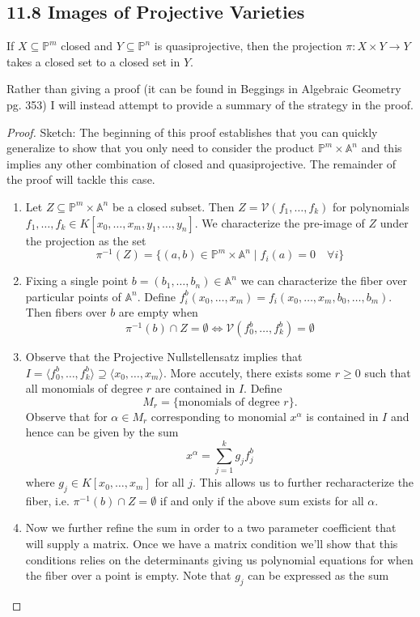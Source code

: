\documentclass[40pt]{article}
\newcommand{\Proj}{\mathbb{P}}
\newcommand{\A}{\mathbb{A}}
\newcommand{\V}{\mathcal{V}}
\newcommand{\la}{\langle}
\newcommand{\ra}{\rangle}
\theoremstyle{remark}
\begin{document}
			\subsection{11.8 Images of Projective Varieties}
			\begin{prop}
				If $X \subseteq \Proj^m$ closed and $Y \subseteq \Proj^n$ is quasiprojective, then the projection $\pi : X \times Y \to Y$ takes a closed set to a closed set in $Y$. 
			\end{prop}
			Rather than giving a proof (it can be found in Beggings in Algebraic Geometry pg. 353) I will instead attempt to provide a summary of the strategy in the proof. 
			\begin{proof}
				Sketch: The beginning of this proof establishes that you can quickly generalize to show that you only need to consider the product $\Proj^m \times \A^n$ and this implies any other combination of closed and quasiprojective. The remainder of the proof will tackle this case. 
				\begin{enumerate}
					\item[1)] Let $Z \subseteq \Proj^m \times \A^n$ be a closed subset. Then $Z =\V(f_1,\dots,f_k)$ for polynomials $f_1,\dots,f_k \in K[x_0,\dots,x_m,y_1,\dots,y_n]$. We characterize the pre-image of $Z$ under the projection as the set
					\[
					\pi^{-1}(Z) = \{(a,b) \in \Proj^m \times \A^n \; | \; f_i(a) = 0 \quad \forall i\}
					\]
					\item[2)] Fixing a single point $b = (b_1,\dots,b_n) \in \A^n$ we can characterize the fiber over particular points of $\A^n$. Define $f_i^b(x_0,\dots,x_m) = f_i(x_0,\dots,x_m,b_0,\dots,b_m)$. Then fibers over $b$ are empty when
					\[
					\pi^{-1}(b) \cap Z = \emptyset \iff \V(f_0^b,\dots,f_k^b) = \emptyset
					\]
					\item[3)] Observe that the Projective Nullstellensatz implies that $I = \la f_0^b ,\dots,f_k^b \ra  \supseteq \la x_0,\dots,x_m\ra$. More accutely, there exists some $r \geq 0$ such that all monomials of degree $r$ are contained in $I$. Define
					\[
					M_r = \{\text{monomials of degree $r$}\}.
					\]
					Observe that for $\alpha \in M_r$ corresponding to monomial $x^\alpha$ is contained in $I$ and hence can be given by the sum
					\[
					x^\alpha = \sum_{j=1}^k g_jf_j^b
					\]
					where $g_j \in K[x_0,\dots,x_m]$ for all $j$. This allows us to further recharacterize the fiber, i.e. $\pi^{-1}(b) \cap Z = \emptyset$ if and only if the above sum exists for all $\alpha$. 
					\item[4)] Now we further refine the sum in order to a two parameter coefficient that will supply a matrix. Once we have a matrix condition we'll show that this conditions relies on the determinants giving us polynomial equations for when the fiber over a point is empty. Note that $g_j$ can be expressed as the sum

\end{enumerate}
\end{proof}
\end{document}
